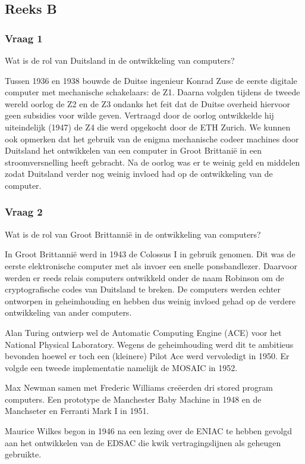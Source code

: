 \documentclass[../main.tex]{subfiles}
\begin{document}
\subsection{Reeks B}
\subsubsection{Vraag 1}
\begin{question}
Wat is de rol van Duitsland in de ontwikkeling van computers?
\end{question}
\begin{solution}
Tussen 1936 en 1938 bouwde de Duitse ingenieur Konrad Zuse de eerste digitale computer met mechanische schakelaars: de Z1.
Daarna volgden tijdens de tweede wereld oorlog de Z2 en de Z3 ondanks het feit dat de Duitse overheid hiervoor geen subsidies voor wilde geven.
Vertraagd door de oorlog ontwikkelde hij uiteindelijk (1947) de Z4 die werd opgekocht door de ETH Zurich.
We kunnen ook opmerken dat het gebruik van de enigma mechanische codeer machines door Duitsland het ontwikkelen van een computer in Groot Brittani\"e in een stroomversnelling heeft gebracht.
Na de oorlog was er te weinig geld en middelen zodat Duitsland verder nog weinig invloed had op de ontwikkeling van de computer.
\end{solution}

\subsubsection{Vraag 2}
\begin{question}
Wat is de rol van Groot Brittanni\"e in de ontwikkeling van computers?
\end{question}
\begin{solution}
In Groot Brittanni\"e werd in 1943 de Colossus I in gebruik genomen. Dit was de eerste elektronische computer met als invoer een snelle ponsbandlezer. 
Daarvoor werden er reeds relais computers ontwikkeld onder de naam Robinson om de cryptografische codes van Duitsland te breken.
De computers werden echter ontworpen in geheimhouding en hebben dus weinig invloed gehad op de verdere ontwikkeling van ander computers.

Alan Turing ontwierp wel de Automatic Computing Engine (ACE) voor het National Physical Laboratory. 
Wegens de geheimhouding werd dit te ambitieus bevonden hoewel er toch een (kleinere) Pilot Ace werd vervoledigt in 1950.
Er volgde een tweede implementatie namelijk de MOSAIC in 1952.

Max Newman samen met Frederic Williams cre\"eerden dri stored program computers.
Een prototype de Manchester Baby Machine in 1948 en de Manchseter en Ferranti Mark I in 1951.

Maurice Wilkes  begon in 1946 na een lezing over de ENIAC te hebben gevolgd aan het ontwikkelen van de EDSAC die kwik vertragingslijnen als geheugen gebruikte.
\end{solution}
\end{document}
